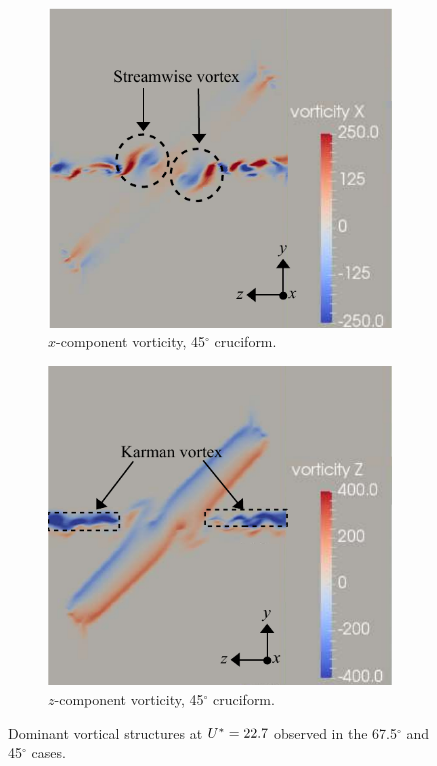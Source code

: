\documentclass[oneside]{utmthesis}
\begin{document}
\begin{figure}[H]
  \begin{subfigure}[h]{0.48\textwidth}
    \centering
    \includegraphics[width=1\textwidth]{figs/vorx45}
    \caption{$x$-component vorticity, 45$^{\circ}$ cruciform.}
    \label{fig:vorx45}
  \end{subfigure}
  \hfill
  \begin{subfigure}[h]{0.48\textwidth}
    \centering
    \includegraphics[width=1\textwidth]{figs/vorz45}
    \caption{$z$-component vorticity, 45$^{\circ}$ cruciform.}
    \label{fig:vorz45}
  \end{subfigure}
  \caption{Dominant vortical structures at $U^{*} = 22.7$ observed in the 67.5$^{\circ}$ and 45$^{\circ}$ cases.} \label{fig:vortStruct67545}
\end{figure}
\end{document}
